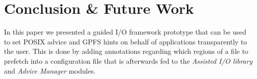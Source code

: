 \section{Conclusion \& Future Work}
\label{sec: mercury_conclusion}

In this paper we presented a guided I/O framework prototype that can be used to set POSIX advice and GPFS hints on behalf of applications transparently to the user. This is done by adding annotations regarding which regions of a file to prefetch into a configuration file that is afterwards fed to the \textit{Assisted I/O library} and \textit{Advice Manager} modules. %

 
